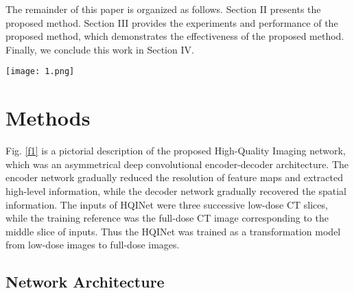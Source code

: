 \documentclass[conference]{IEEEtran}
\begin{document}
The remainder of this paper is organized as follows. Section II presents the proposed method. Section III provides the experiments and performance of the proposed method, which demonstrates the effectiveness of the proposed method.  Finally, we conclude this work in Section IV.

\begin{figure*}[!t]
\centering
\texttt{[image: 1.png]}
\caption{Block diagram of the architecture of the proposed network.}
\label{f1}
\end{figure*}

\begin{figure*}[!t]
\centering
{}
\hfil
{}
\hfil
{}
\caption{Block diagram of the architecture of encoder blocks. (a) Spatial and Channel Squeeze and Channel Excitation (scSE) residual encoder  block; (b) Atrous Spatial Pyramid Pooling (ASPP) with depth separable convolution; (c) scSE block.}
\label{block}
\end{figure*}
	
\section{Methods}

Fig. \ref{f1} is a pictorial description of the proposed High-Quality Imaging network, which was an asymmetrical deep convolutional encoder-decoder architecture. The encoder network gradually reduced the resolution of feature maps and extracted high-level information, while the decoder network gradually recovered the spatial information. The inputs of HQINet were three successive low-dose CT slices, while the training reference was the full-dose CT image corresponding to the middle slice of inputs. Thus the HQINet was trained as a transformation model from low-dose images to full-dose images.

\subsection{Network Architecture}
\end{document}
